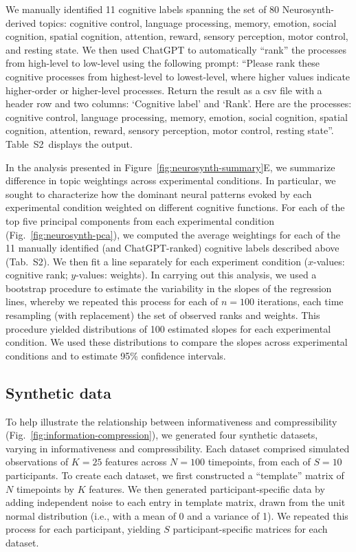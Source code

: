 \documentclass[english, 11pt]{article}
\newcommand{\topicTags}{S2}
\begin{document}
We manually identified 11 cognitive labels spanning the set of 80
Neurosynth-derived topics: cognitive control, language processing, memory,
emotion, social cognition, spatial cognition, attention, reward, sensory
perception, motor control, and resting state. We then used ChatGPT to
automatically ``rank'' the processes from high-level to low-level using the
following prompt: ``Please rank these cognitive processes from highest-level to
lowest-level, where higher values indicate higher-order or higher-level
processes. Return the result as a csv file with a header row and two columns:
`Cognitive label' and `Rank'. Here are the processes: cognitive control,
language processing, memory, emotion, social cognition, spatial cognition,
attention, reward, sensory perception, motor control, resting state''.
Table~\topicTags~displays the output. 

In the analysis presented in Figure~\ref{fig:neurosynth-summary}E, we summarize
difference in topic weightings across experimental conditions. In particular,
we sought to characterize how the dominant neural patterns evoked by each
experimental condition weighted on different cognitive functions. For each of
the top five principal components from each experimental condition
(Fig.~\ref{fig:neurosynth-pca}), we computed the average weightings for each of
the 11 manually identified (and ChatGPT-ranked) cognitive labels described
above (Tab.~\topicTags). We then fit a line separately for each experiment
condition ($x$-values: cognitive rank; $y$-values: weights). In carrying out
this analysis, we used a bootstrap procedure to estimate the variability in the
slopes of the regression lines, whereby we repeated this process for each of $n
= 100$ iterations, each time resampling (with replacement) the set of observed
ranks and weights. This procedure yielded distributions of 100 estimated slopes
for each experimental condition. We used these distributions to compare the
slopes across experimental conditions and to estimate 95\% confidence intervals.



\subsection*{Synthetic data}

To help illustrate the relationship between informativeness and compressibility
(Fig.~\ref{fig:information-compression}), we generated four synthetic datasets,
varying in informativeness and compressibility. Each dataset comprised
simulated observations of $K = 25$ features across $N = 100$ timepoints, from each of $S = 10$
participants. To create each dataset, we first constructed a ``template''
matrix of $N$ timepoints by $K$ features. We then generated participant-specific
data by adding independent noise to each entry in template matrix, drawn from
the unit normal distribution (i.e., with a mean of 0 and a variance of 1). We
repeated this process for each participant, yielding $S$ participant-specific
matrices for each dataset.
\end{document}
